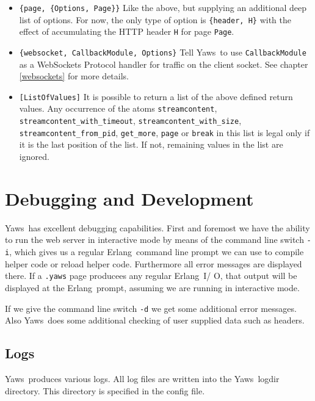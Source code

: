 \documentclass[11pt,oneside,english]{book}
\newcommand{\Erlang}            %
        {{\sc Erlang}}
\newcommand{\Yaws}            %
        {{\sc Yaws}}
\begin{document}
\begin{itemize}
\item \verb+{page, {Options, Page}}+ Like the above, but supplying an
  additional deep list of options.  For now, the only type of option
  is \verb+{header, H}+ with the effect of accumulating the HTTP
  header \verb+H+ for page \verb+Page+.

\item \verb+{websocket, CallbackModule, Options}+ Tell \Yaws\  to use
  \verb+CallbackModule+ as a WebSockets Protocol handler for traffic
  on the client socket. See chapter \ref{websockets} for more details.

\item \verb+[ListOfValues]+ It is possible to return a list of the above defined
  return values. Any occurrence of the atoms \verb+streamcontent+,
  \verb+streamcontent_with_timeout+,
  \verb+streamcontent_with_size+,\\
  \verb+streamcontent_from_pid+, \verb+get_more+, \verb+page+ or \verb+break+ in
  this list is legal only if it is the last position of the list. If not,
  remaining values in the list are ignored.

\end{itemize}



\chapter{Debugging and Development}

\Yaws\ has excellent debugging capabilities. First and foremost we
have the ability to run the web server in interactive mode by means of
the command line switch \verb+-i+, which gives us a regular
\Erlang\ command line prompt we can use to compile helper code or
reload helper code. Furthermore all error messages are displayed
there.  If a \verb+.yaws+ page producees any regular \Erlang\ I\slash
O, that output will be displayed at the \Erlang\ prompt, assuming we
are running in interactive mode.

If we give the command line switch \verb+-d+ we get some additional
error messages. Also \Yaws\ does some additional checking of user
supplied data such as headers.

\section{Logs}
\Yaws\ produces various logs. All log files are written into the
\Yaws\ logdir directory. This directory is specified in the config
file.
\end{document}
